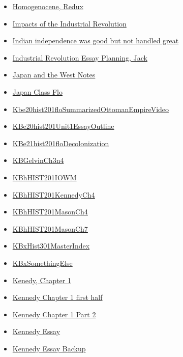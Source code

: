 \documentclass[11pt]{article}
\begin{document}
\begin{itemize}
\begin{itemize}
\begin{itemize}
\item \href{history/history10/KBhHIST201HomogenosceneRedux.org}{Homogenocene, Redux}
\item \href{history/history10/KBhHIST201ImpactsofIR.org}{Impacts of the Industrial Revolution}
\item \href{history/history10/KBe21hist201floBittersweetIndianIndependence.org}{Indian independence was good but not handled great}
\item \href{history/history10/KBhHIST201Unit3EssayJack.org}{Industrial Revolution Essay Planning, Jack}
\item \href{history/history10/KBxJapanandtheWest.org}{Japan and the West Notes}
\item \href{history/history10/KBhHIST201JapanClassFlo.org}{Japan Class Flo}
\item \href{history/history10/Kbe20hist201floSummarizedOttomanEmpireVideo.org}{Kbe20hist201floSummarizedOttomanEmpireVideo}
\item \href{history/history10/KBe20hist201Unit1EssayOutline.org}{KBe20hist201Unit1EssayOutline}
\item \href{history/history10/KBe21hist201floDecolonization.org}{KBe21hist201floDecolonization}
\item \href{history/history10/KBGelvinCh3n4.org}{KBGelvinCh3n4}
\item \href{history/history10/KBhHIST201IOWM.org}{KBhHIST201IOWM}
\item \href{history/history10/KBhHIST201KennedyCh4.org}{KBhHIST201KennedyCh4}
\item \href{history/history10/KBhHIST201MasonCh4.org}{KBhHIST201MasonCh4}
\item \href{history/history10/KBhHIST201MasonCh7.org}{KBhHIST201MasonCh7}
\item \href{history/history10/KBxHist301MasterIndex.org}{KBxHist301MasterIndex}
\item \href{history/history10/KBxSomethingElse.org}{KBxSomethingElse}
\item \href{history/history10/KBhHIST201KennedyCh1.org}{Kenedy, Chapter 1}
\item \href{history/history10/KBe20hist201floKennedyCH1pt1.org}{Kennedy Chapter 1 first half}
\item \href{history/history10/retExr0nKennedyCh1Pt2.org}{Kennedy Chapter 1 Part 2}
\item \href{history/history10/KBhHIST201KennedyEssay.org}{Kennedy Essay}
\item \href{history/history10/KBhHIST201EssayBackup.org}{Kennedy Essay Backup}

\end{itemize}
\end{itemize}
\end{itemize}
\end{document}
